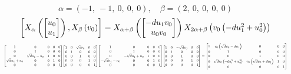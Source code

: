 \documentclass[11pt]{article}
\theoremstyle{definition}
\begin{document}
\[
\alpha = \left( -1, \  -1, \  0, \  0, \  0\right), \quad \beta = \left( 2, \  0, \  0, \  0, \  0\right)
\]
\[
\scaletoalign{\textwidth}{\left[ X_{\alpha}\left(\left[\begin{matrix}u_{0}\\u_{1}\end{matrix}\right]\right), X_{\beta}\left(v_{0}\right) \right] = X_{\alpha + \beta}\left(\left[\begin{matrix}- d u_{1} v_{0}\\u_{0} v_{0}\end{matrix}\right]\right) X_{2\alpha + \beta}\left(v_{0} \left(- d u_{1}^{2} + u_{0}^{2}\right)\right)}
\]
\[
\scaletoalign{\textwidth}{{\left[\begin{matrix}1 & 0 & 0 & 0 & 0\\0 & 1 & 0 & 0 & 0\\0 & \sqrt{d} u_{1} - u_{0} & 1 & 0 & 0\\\sqrt{d} u_{1} + u_{0} & 0 & 0 & 1 & 0\\0 & 0 & 0 & 0 & 1\end{matrix}\right]} {\left[\begin{matrix}1 & 0 & \sqrt{d} v_{0} & 0 & 0\\0 & 1 & 0 & 0 & 0\\0 & 0 & 1 & 0 & 0\\0 & 0 & 0 & 1 & 0\\0 & 0 & 0 & 0 & 1\end{matrix}\right]} {\left[\begin{matrix}1 & 0 & 0 & 0 & 0\\0 & 1 & 0 & 0 & 0\\0 & - \sqrt{d} u_{1} + u_{0} & 1 & 0 & 0\\- \sqrt{d} u_{1} - u_{0} & 0 & 0 & 1 & 0\\0 & 0 & 0 & 0 & 1\end{matrix}\right]} {\left[\begin{matrix}1 & 0 & - \sqrt{d} v_{0} & 0 & 0\\0 & 1 & 0 & 0 & 0\\0 & 0 & 1 & 0 & 0\\0 & 0 & 0 & 1 & 0\\0 & 0 & 0 & 0 & 1\end{matrix}\right]} = {\left[\begin{matrix}1 & v_{0} \left(\sqrt{d} u_{0} - d u_{1}\right) & 0 & 0 & 0\\0 & 1 & 0 & 0 & 0\\0 & 0 & 1 & 0 & 0\\0 & \sqrt{d} v_{0} \left(- d u_{1}^{2} + u_{0}^{2}\right) & v_{0} \left(\sqrt{d} u_{0} + d u_{1}\right) & 1 & 0\\0 & 0 & 0 & 0 & 1\end{matrix}\right]}}
\]
\end{document}
